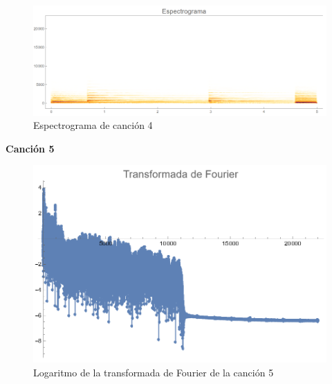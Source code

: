 \documentclass[12pt, letterpaper]{article}
\begin{document}
\begin{figure}[H]
  \centering
  \includegraphics[width=.9\linewidth]{imgs/Cancion4/espectrograma.png}
  \caption{Espectrograma de canción 4}
  \label{fig:04i}
\end{figure}

\textbf{\large{Canción 5}}
\begin{figure}[H]
  \centering
  \includegraphics[width=0.7\linewidth]{imgs/Cancion5/transformada.png}
  \caption{Logaritmo de la transformada de Fourier de la canción 5}
  \label{fig:05a}
\end{figure}
\end{document}
